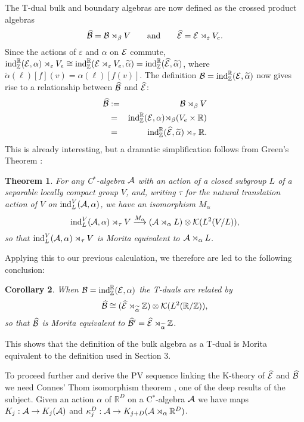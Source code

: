 \documentclass[11pt]{article}
\newcommand{\real}{{\mathbb R}}
\newcommand{\integer}{{\mathbb Z}}
\newcommand{\alg}{{\cal A}}
\newcommand{\cb}{{\cal B}}
\newcommand{\ce}{{\cal E}}
\newcommand{\cpt}{{\cal K}}
\newcommand{\ind}{{\rm ind}}
\newcommand{\wt}[1]{\widetilde{#1}}
\newcommand{\wh}[1]{\widehat{#1}}
\newcommand\rmap[1]{\stackrel{#1}\longrightarrow}
\newtheorem{theorem}{Theorem}
\newtheorem{corollary}[theorem]{Corollary}
\begin{document}
The T-dual bulk and boundary algebras are now defined as the crossed product algebras
$$
\wh{\cb} = \cb\rtimes_\beta V \qquad{\rm and}\qquad \wh{\ce} = \ce\rtimes_\varepsilon V_e.
$$
Since the actions of $\varepsilon$ and $\alpha$ on $\ce$ commute, $\ind_\integer^\real(\ce,\alpha)\rtimes_\varepsilon V_e \cong \ind_\integer^\real(\ce\rtimes_\varepsilon V_e,\wt{\alpha}) = \ind_\integer^\real(\wh{\ce},\wt{\alpha})$, where $\wt{\alpha}(\ell)[f](v) = \alpha(\ell)[f(v)]$.
The definition   $\cb = \ind_\integer^\real(\ce,\wt{\alpha})$ now gives rise to a relationship between $\wh{\cb}$ and $\wh{\ce}$:
\begin{eqnarray*}
\wh{\cb} &:=& \cb\rtimes_\beta V\\ 
&=& \ind_\integer^\real(\ce,\alpha){\rtimes_\beta} (V_e\times \real)\\
&=& \ind_\integer^\real(\wh{\ce},\wt{\alpha})\rtimes_\tau \real. 
\end{eqnarray*}
This is already interesting, but  a dramatic simplification follows from Green's Theorem \cite{G}:

\begin{theorem} For any C$^*$-algebra $\alg$ with an action of a closed subgroup $L$ of a separable locally compact group $V$, and, writing $\tau$ for the natural translation action of $V$ on $\ind_L^V(\alg,\alpha)$, we have an isomorphism $M_\alpha$ 
$$
\ind_L^V(\alg,\alpha)\rtimes_\tau V \rmap{M_\alpha} (\alg\rtimes_\alpha L)\otimes \cpt(L^2(V/L)),
$$
so that $\ind_L^V(\alg,\alpha)\rtimes_\tau V$ is Morita equivalent to $\alg\rtimes_\alpha L$.
\end{theorem}

Applying this to our previous calculation, we therefore are led to the following conclusion: 

\begin{corollary} When $\cb = \ind_\integer^\real(\ce, \alpha)$ the T-duals are related by
$$
\wh{\cb} \cong (\wh{\ce}\rtimes_{\wt{\alpha}} \integer)\otimes \cpt(L^2(\real/\integer)),
$$ 
so that $\wh{\cb}$  is Morita equivalent to $\wh{\cb}^\prime = \wh{\ce}\rtimes_{\wt{\alpha}} \integer$.
\end{corollary}

This shows that the definition of the bulk algebra as a T-dual is Morita equivalent to the definition used in Section 3.

To proceed further and derive the PV sequence linking the K-theory of $\wh{\ce}$ and $\wh{\cb}$ we need Connes' Thom isomorphism theorem \cite{C81}, one of the deep results of the  subject.
Given an action $\alpha$ of $\real^D$ on a C$^*$-algebra $\alg$ we have maps  $K_j:\alg \to K_j(\alg)$ and 
$\kappa_j^D:\alg \to K_{j+D}(\alg\rtimes_\alpha \real^D)$. 
\end{document}
